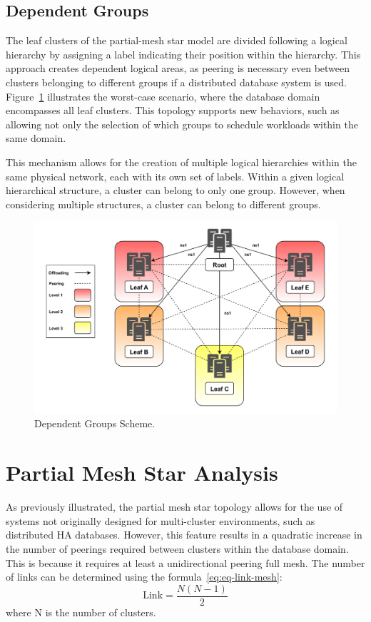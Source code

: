 \subsection{Dependent Groups}
The leaf clusters of the partial-mesh star model are divided following a logical hierarchy by assigning a label indicating their position within the hierarchy. This approach creates dependent logical areas, as peering is necessary even between clusters belonging to different groups if a distributed database system is used. Figure~\ref{fig:group-dep} illustrates the worst-case scenario, where the database domain encompasses all leaf clusters. This topology supports new behaviors, such as allowing not only the selection of which groups to schedule workloads within the same domain.

This mechanism allows for the creation of multiple logical hierarchies within the same physical network, each with its own set of labels. Within a given logical hierarchical structure, a cluster can belong to only one group. However, when considering multiple structures, a cluster can belong to different groups.

\begin{figure}[ht]\centering
\includegraphics[scale=0.7]{Pictures/Level-v4}
\caption{Dependent Groups Scheme.}\label{fig:group-dep}
\end{figure}

\section{Partial Mesh Star Analysis}
As previously illustrated, the partial mesh star topology allows for the use of systems not originally designed for multi-cluster environments, such as distributed HA databases. However, this feature results in a quadratic increase in the number of peerings required between clusters within the database domain. This is because it requires at least a unidirectional peering full mesh. The number of links can be determined using the formula~\eqref{eq:eq-link-mesh}:
\begin{equation} \label{eq:eq-link-mesh}
\text{Link} = \frac{N(N-1)}{2}
\end{equation}
where N is the number of clusters.

